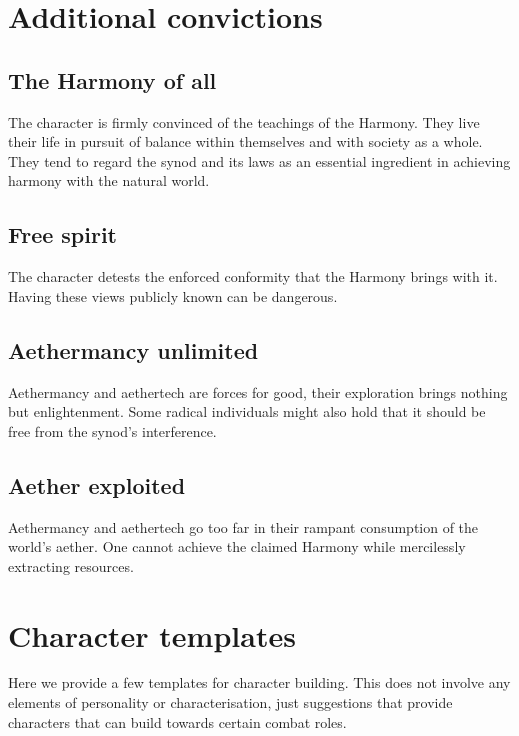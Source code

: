\documentclass[a4paper,11pt,oneside]{book}
\begin{document}
\section{Additional convictions}

\subsection{The Harmony of all}
The character is firmly convinced of the teachings of the Harmony. They live their life in pursuit of balance within themselves and with society as a whole. They tend to regard the synod and its laws as an essential ingredient in achieving harmony with the natural world.

\subsection{Free spirit}
The character detests the enforced conformity that the Harmony brings with it. Having these views publicly known can be dangerous. 

\subsection{Aethermancy unlimited}
Aethermancy and aethertech are forces for good, their exploration brings nothing but enlightenment. Some radical individuals might also hold that it should be free from the synod's interference. 

\subsection{Aether exploited}
Aethermancy and aethertech go too far in their rampant consumption of the world's aether. One cannot achieve the claimed Harmony while mercilessly extracting resources.



\section{Character templates}
Here we provide a few templates for character building. This does not involve any elements of personality or characterisation, just suggestions that provide characters that can build towards certain combat roles. 
\end{document}
